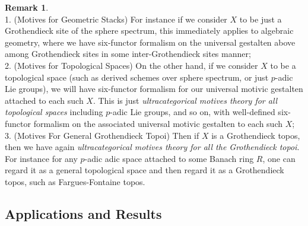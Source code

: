 \documentclass[12pt]{article}
\theoremstyle{definition}
\newtheorem{remark}{Remark}
\begin{document}
\begin{remark}\mbox{}\\
1. (Motives for Geometric Stacks) For instance if we consider $X$ to be just a Grothendieck site of the sphere spectrum, this immediately applies to algebraic geometry, where we have six-functor formalism on the universal gestalten above among Grothendieck sites in some inter-Grothendieck sites manner;\\
2. (Motives for Topological Spaces) On the other hand, if we consider $X$ to be a topological space (such as derived schemes over sphere spectrum, or just $p$-adic Lie groups), we will have six-functor formalism for our universal motivic gestalten attached to each such $X$. This is just \textit{ultracategorical motives theory for all topological spaces} including $p$-adic Lie groups, and so on, with well-defined six-functor formalism on the associated universal motivic gestalten to each such $X$;\\
3. (Motives For General Grothendieck Topoi) Then if $X$ is a Grothendieck topos, then we have again \textit{ultracategorical motives theory for all the Grothendieck topoi}. For instance for any $p$-adic adic space attached to some Banach ring $R$, one can regard it as a general topological space and then regard it as a Grothendieck topos, such as Fargues-Fontaine topos. 
\end{remark}











\subsection{Applications and Results}
\end{document}

